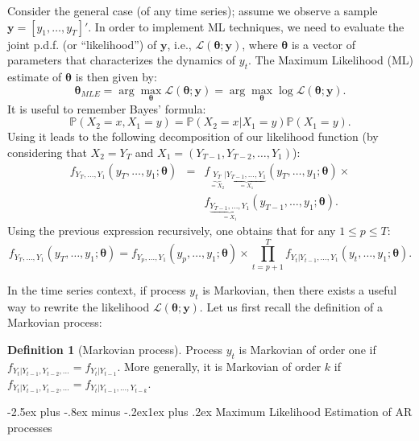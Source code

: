 \documentclass[
  11pt,
]{book}
\makeatletter
\renewcommand\subsection{\@startsection{subsection}{2}{\z@}
  {-2.5ex plus -.8ex minus -.2ex}{1ex plus .2ex}
  {\normalfont\large\bfseries\color{TextbookInk}}}
\theoremstyle{definition}
\newtheorem{definition}{Definition}[chapter]
\theoremstyle{definition}
\theoremstyle{definition}
\theoremstyle{definition}
\theoremstyle{remark}
\makeatother
\begin{document}
Consider the general case (of any time series); assume we observe a sample \(\mathbf{y}=[y_1,\dots,y_T]'\). In order to implement ML techniques, we need to evaluate the joint p.d.f. (or ``likelihood'') of \(\mathbf{y}\), i.e., \(\mathcal{L}(\boldsymbol\theta;\mathbf{y})\), where \(\boldsymbol\theta\) is a vector of parameters that characterizes the dynamics of \(y_t\). The Maximum Likelihood (ML) estimate of \(\boldsymbol\theta\) is then given by:
\[
\boxed{\boldsymbol\theta_{MLE} = \arg \max_{\boldsymbol\theta} \mathcal{L}(\boldsymbol\theta;\mathbf{y})  = \arg \max_{\boldsymbol\theta} \log \mathcal{L}(\boldsymbol\theta;\mathbf{y}).}
\]
It is useful to remember Bayes' formula:
\[
\mathbb{P}(X_2=x,X_1=y) = \mathbb{P}(X_2=x|X_1=y)\mathbb{P}(X_1=y).
\]
Using it leads to the following decomposition of our likelihood function (by considering that \(X_2=Y_T\) and \(X_1=(Y_{T-1},Y_{T-2},\dots,Y_1)\)):
\begin{eqnarray*}
f_{Y_T,\dots,Y_1}(y_T,\dots,y_1;\boldsymbol\theta) &=&f_{\underbrace{Y_T}_{=X_2}|\underbrace{Y_{T-1},\dots,Y_1}_{=X_1}}(y_T,\dots,y_1;\boldsymbol\theta) \times \\
&& f_{\underbrace{Y_{T-1},\dots,Y_1}_{=X_1}}(y_{T-1},\dots,y_1;\boldsymbol\theta).
\end{eqnarray*}
Using the previous expression recursively, one obtains that for any \(1 \leq p \leq T\):
\begin{equation}
f_{Y_T,\dots,Y_1}(y_T,\dots,y_1;\boldsymbol\theta) = f_{Y_p,\dots,Y_1}(y_p,\dots,y_1;\boldsymbol\theta) \times \prod_{t=p+1}^{T} f_{Y_t|Y_{t-1},\dots,Y_1}(y_t,\dots,y_1;\boldsymbol\theta).\label{eq:recursMLE}
\end{equation}

In the time series context, if process \(y_t\) is Markovian, then there exists a useful way to rewrite the likelihood \(\mathcal{L}(\boldsymbol\theta;\mathbf{y})\). Let us first recall the definition of a Markovian process:

\begin{definition}[Markovian process]
\protect\hypertarget{def:Markov}{}\label{def:Markov}Process \(y_t\) is Markovian of order one if \(f_{Y_t|Y_{t-1},Y_{t-2},\dots} = f_{Y_t|Y_{t-1}}\). More generally, it is Markovian of order \(k\) if \(f_{Y_t|Y_{t-1},Y_{t-2},\dots} = f_{Y_t|Y_{t-1},\dots,Y_{t-k}}\).
\end{definition}

\subsection{Maximum Likelihood Estimation of AR processes}\label{estimAR}
\end{document}
